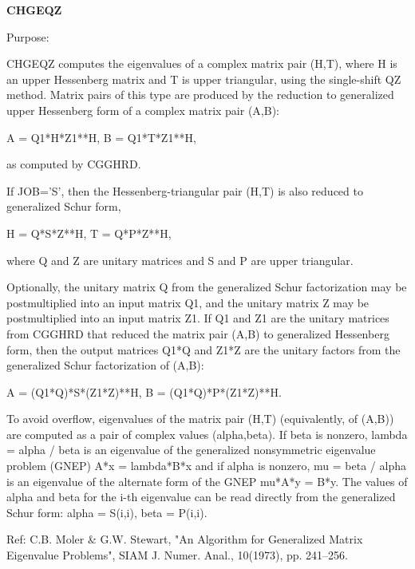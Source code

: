 {\bfseries C\+H\+G\+E\+Q\+Z} 

 \begin{DoxyParagraph}{Purpose\+: }
\begin{DoxyVerb} CHGEQZ computes the eigenvalues of a complex matrix pair (H,T),
 where H is an upper Hessenberg matrix and T is upper triangular,
 using the single-shift QZ method.
 Matrix pairs of this type are produced by the reduction to
 generalized upper Hessenberg form of a complex matrix pair (A,B):
 
    A = Q1*H*Z1**H,  B = Q1*T*Z1**H,
 
 as computed by CGGHRD.
 
 If JOB='S', then the Hessenberg-triangular pair (H,T) is
 also reduced to generalized Schur form,
 
    H = Q*S*Z**H,  T = Q*P*Z**H,
 
 where Q and Z are unitary matrices and S and P are upper triangular.
 
 Optionally, the unitary matrix Q from the generalized Schur
 factorization may be postmultiplied into an input matrix Q1, and the
 unitary matrix Z may be postmultiplied into an input matrix Z1.
 If Q1 and Z1 are the unitary matrices from CGGHRD that reduced
 the matrix pair (A,B) to generalized Hessenberg form, then the output
 matrices Q1*Q and Z1*Z are the unitary factors from the generalized
 Schur factorization of (A,B):
 
    A = (Q1*Q)*S*(Z1*Z)**H,  B = (Q1*Q)*P*(Z1*Z)**H.
 
 To avoid overflow, eigenvalues of the matrix pair (H,T)
 (equivalently, of (A,B)) are computed as a pair of complex values
 (alpha,beta).  If beta is nonzero, lambda = alpha / beta is an
 eigenvalue of the generalized nonsymmetric eigenvalue problem (GNEP)
    A*x = lambda*B*x
 and if alpha is nonzero, mu = beta / alpha is an eigenvalue of the
 alternate form of the GNEP
    mu*A*y = B*y.
 The values of alpha and beta for the i-th eigenvalue can be read
 directly from the generalized Schur form:  alpha = S(i,i),
 beta = P(i,i).

 Ref: C.B. Moler & G.W. Stewart, "An Algorithm for Generalized Matrix
      Eigenvalue Problems", SIAM J. Numer. Anal., 10(1973),
      pp. 241--256.\end{DoxyVerb}
 
\end{DoxyParagraph}

